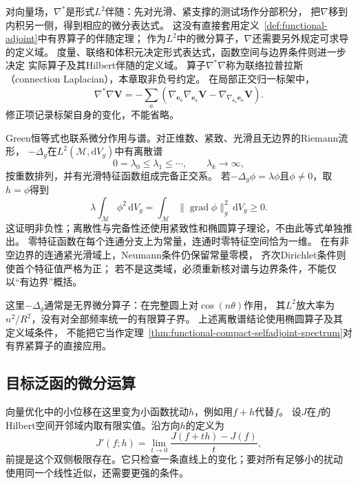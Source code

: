 对向量场，$\nabla^*$是形式$L^2$伴随：先对光滑、紧支撑的测试场作分部积分，
把$\nabla$移到内积另一侧，得到相应的微分表达式。
这没有直接套用定义~\ref{def:functional-adjoint}中有界算子的伴随定理；
作为$L^2$中的微分算子，$\nabla$还需要另外规定可求导的定义域。
度量、联络和体积元决定形式表达式，函数空间与边界条件则进一步决定
实际算子及其Hilbert伴随的定义域。
算子$\nabla^*\nabla$称为联络拉普拉斯（connection Laplacian），本章取非负号约定。
在局部正交归一标架中，
\[
 \nabla^*\nabla\bm V
 =-\sum_a\left(\nabla_{\bm e_a}\nabla_{\bm e_a}\bm V
                 -\nabla_{\nabla_{\bm e_a}\bm e_a}\bm V\right).
\]
修正项记录标架自身的变化，不能省略。

Green恒等式也联系微分作用与谱。对正维数、紧致、光滑且无边界的Riemann流形，
$-\Delta_g$在$L^2(\mathcal M,\mathrm dV_g)$中有离散谱
\[
 0=\lambda_0\leq\lambda_1\leq\cdots,\qquad\lambda_k\longrightarrow\infty,
\]
按重数排列，并有光滑特征函数组成完备正交系。
若$-\Delta_g\phi=\lambda\phi$且$\phi\neq0$，取$h=\phi$得到
\[
 \lambda\int_{\mathcal M}\phi^2\,\mathrm dV_g
 =\int_{\mathcal M}\lVert\operatorname{grad}\phi\rVert_g^2\,\mathrm dV_g
 \geq0.
\]
这证明非负性；离散性与完备性还使用紧致性和椭圆算子理论，不由此等式单独推出。
零特征函数在每个连通分支上为常量，连通时零特征空间恰为一维。
在有非空边界的连通紧光滑域上，Neumann条件仍保留常量零模，
齐次Dirichlet条件则使首个特征值严格为正；
若不是这类域，必须重新核对谱与边界条件，不能仅以“有边界”概括。


这里$-\Delta_g$通常是无界微分算子：在完整圆上对$\cos(n\theta)$作用，
其$L^2$放大率为$n^2/R^2$，没有对全部频率统一的有限算子界。
上述离散谱结论使用椭圆算子及其定义域条件，
不能把它当作定理~\ref{thm:functional-compact-selfadjoint-spectrum}对有界紧算子的直接应用。

\subsection{目标泛函的微分运算}
\label{sec:functional-objective-differentiation}

向量优化中的小位移在这里变为小函数扰动$h$，例如用$f+h$代替$f$。
设$J$在$f$的Hilbert空间开邻域内取有限实值。沿方向$h$的定义为
\[
 J'(f;h)=\lim_{t\to0}\frac{J(f+th)-J(f)}{t},
\]
前提是这个双侧极限存在。它只检查一条直线上的变化；要对所有足够小的扰动
使用同一个线性近似，还需要更强的条件。

